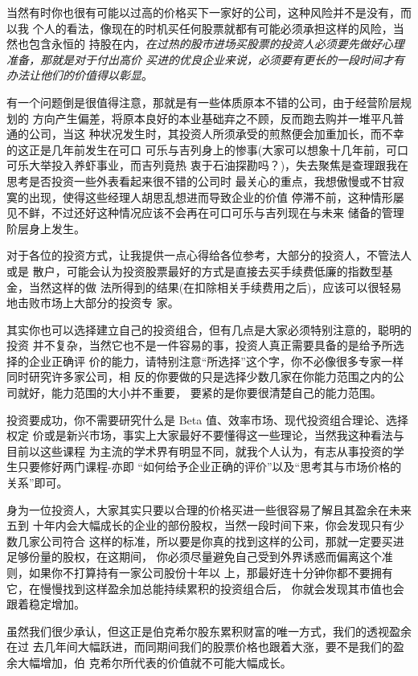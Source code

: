 \documentclass[UTF8,a4paper,zihao=-4,fontset = windows]{ctexart} %
\begin{document}
当然有时你也很有可能以过高的价格买下一家好的公司，这种风险并不是没有，而以我
个人的看法，像现在的时机买任何股票就都有可能必须承担这样的风险，当然也包含永恒的
持股在内，\textit{在过热的股市进场买股票的投资人必须要先做好心理准备，那就是对于付出高价
买进的优良企业来说，必须要有更长的一段时间才有办法让他们的价值得以彰显}。

有一个问题倒是很值得注意，那就是有一些体质原本不错的公司，由于经营阶层规划的
方向产生偏差，将原本良好的本业基础弃之不顾，反而跑去购并一堆平凡普通的公司，当这
种状况发生时，其投资人所须承受的煎熬便会加重加长，而不幸的这正是几年前发生在可口
可乐与吉列身上的惨事(大家可以想象十几年前，可口可乐大举投入养虾事业，而吉列竟热
衷于石油探勘吗？)，失去聚焦是查理跟我在思考是否投资一些外表看起来很不错的公司时
最关心的重点，我想傲慢或不甘寂寞的出现，使得这些经理人胡思乱想进而导致企业的价值
停滞不前，这种情形屡见不鲜，不过还好这种情况应该不会再在可口可乐与吉列现在与未来
储备的管理阶层身上发生。

对于各位的投资方式，让我提供一点心得给各位参考，大部分的投资人，不管法人或是
散户，可能会认为投资股票最好的方式是直接去买手续费低廉的指数型基金，当然这样的做
法所得到的结果(在扣除相关手续费用之后)，应该可以很轻易地击败市场上大部分的投资专
家。

其实你也可以选择建立自己的投资组合，但有几点是大家必须特别注意的，聪明的投资
并不复杂，当然它也不是一件容易的事，投资人真正需要具备的是给予所选择的企业正确评
价的能力，请特别注意“所选择”这个字，你不必像很多专家一样同时研究许多家公司，相
反的你要做的只是选择少数几家在你能力范围之内的公司就好，能力范围的大小并不重要，
要紧的是你要很清楚自己的能力范围。

投资要成功，你不需要研究什么是 Beta 值、效率市场、现代投资组合理论、选择权定
价或是新兴市场，事实上大家最好不要懂得这一些理论，当然我这种看法与目前以这些课程
为主流的学术界有明显不同，就我个人认为，有志从事投资的学生只要修好两门课程-亦即
“如何给予企业正确的评价”以及“思考其与市场价格的关系”即可。

身为一位投资人，大家其实只要以合理的价格买进一些很容易了解且其盈余在未来五到
十年内会大幅成长的企业的部份股权，当然一段时间下来，你会发现只有少数几家公司符合
这样的标准，所以要是你真的找到这样的公司，那就一定要买进足够份量的股权，在这期间，
你必须尽量避免自己受到外界诱惑而偏离这个准则，如果你不打算持有一家公司股份十年以
上，那最好连十分钟你都不要拥有它，在慢慢找到这样盈余加总能持续累积的投资组合后，
你就会发现其市值也会跟着稳定增加。

虽然我们很少承认，但这正是伯克希尔股东累积财富的唯一方式，我们的透视盈余在过
去几年间大幅跃进，而同期间我们的股票价格也跟着大涨，要不是我们的盈余大幅增加，伯
克希尔所代表的价值就不可能大幅成长。
\end{document}

